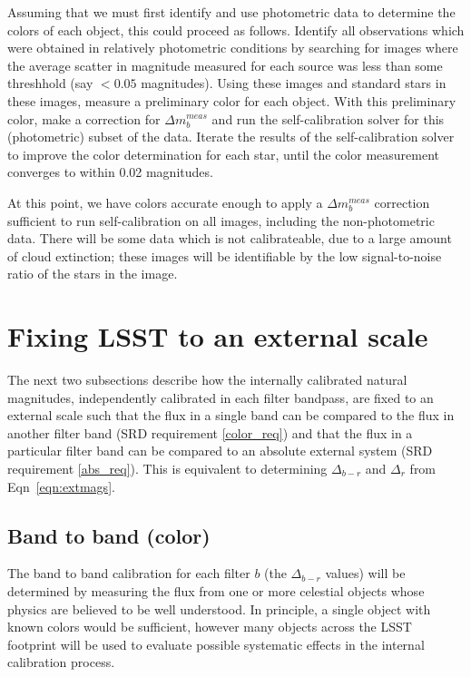 \documentclass[12pt,preprint]{aastex}
\begin{document}
Assuming that we must first identify and use photometric data to
determine the colors of each object, this could proceed as follows. 
Identify all observations which were obtained in relatively
photometric conditions by searching for images where the average
scatter in magnitude measured for each source was less than some
threshhold (say $<0.05$ magnitudes). Using these images and standard
stars in these images, measure a preliminary color for each
object. With this preliminary color, make a correction for $\Delta
m_b^{meas}$ and run the self-calibration solver for this (photometric) subset of the
data. Iterate the results of the self-calibration solver to improve
the color determination for each star, until the color measurement
converges to within 0.02 magnitudes. 

At this point, we have colors accurate enough to apply a $\Delta
m_b^{meas}$ correction sufficient to run self-calibration on all
images, including the non-photometric data.  There will be some data
which is not calibrateable, due to a large amount of cloud
extinction; these images will be identifiable by the low
signal-to-noise ratio of the stars in the image. 

\section{Fixing LSST to an external scale}
\label{sec:calib_external}

The next two subsections describe how the internally calibrated
natural magnitudes, independently calibrated in each filter bandpass, are fixed
to an external scale such that the flux in a single band can be compared to the
flux in another filter band (SRD requirement \ref{color_req}) and that
the flux in a particular filter band can be compared to an absolute
external system (SRD requirement \ref{abs_req}). This is equivalent to
determining $\Delta_{b-r}$ and $\Delta_r$ from Eqn~\ref{eqn:extmags}. 

\subsection{Band to band (color)}

The band to band calibration for each filter $b$ (the $\Delta_{b-r}$
values) will be determined by measuring the flux from one or more
celestial objects whose physics are believed to be well
understood. In principle, a single object with known colors would be
sufficient, however many objects across the LSST footprint
will be used to evaluate possible systematic effects in the internal
calibration process. 
\end{document}
